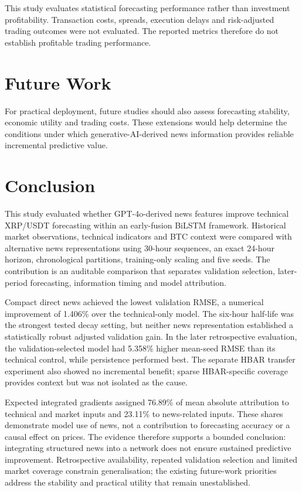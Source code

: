 This study evaluates statistical forecasting performance rather than investment profitability. Transaction costs, spreads, execution delays and risk-adjusted trading outcomes were not evaluated. The reported metrics therefore do not establish profitable trading performance.


\section{Future Work}
\label{sec:future-work}

For practical deployment, future studies should also assess forecasting stability, economic utility and trading costs. These extensions would help determine the conditions under which generative-AI-derived news information provides reliable incremental predictive value.

\section{Conclusion}
\label{sec:Conclusion}

This study evaluated whether GPT-4o-derived news features improve technical XRP/USDT forecasting within an early-fusion BiLSTM framework. Historical market observations, technical indicators and BTC context were compared with alternative news representations using 30-hour sequences, an exact 24-hour horizon, chronological partitions, training-only scaling and five seeds. The contribution is an auditable comparison that separates validation selection, later-period forecasting, information timing and model attribution.

Compact direct news achieved the lowest validation RMSE, a numerical improvement of 1.406\% over the technical-only model. The six-hour half-life was the strongest tested decay setting, but neither news representation established a statistically robust adjusted validation gain. In the later retrospective evaluation, the validation-selected model had 5.358\% higher mean-seed RMSE than its technical control, while persistence performed best. The separate HBAR transfer experiment also showed no incremental benefit; sparse HBAR-specific coverage provides context but was not isolated as the cause.

Expected integrated gradients assigned 76.89\% of mean absolute attribution to technical and market inputs and 23.11\% to news-related inputs. These shares demonstrate model use of news, not a contribution to forecasting accuracy or a causal effect on prices. The evidence therefore supports a bounded conclusion: integrating structured news into a network does not ensure sustained predictive improvement. Retrospective availability, repeated validation selection and limited market coverage constrain generalisation; the existing future-work priorities address the stability and practical utility that remain unestablished.

